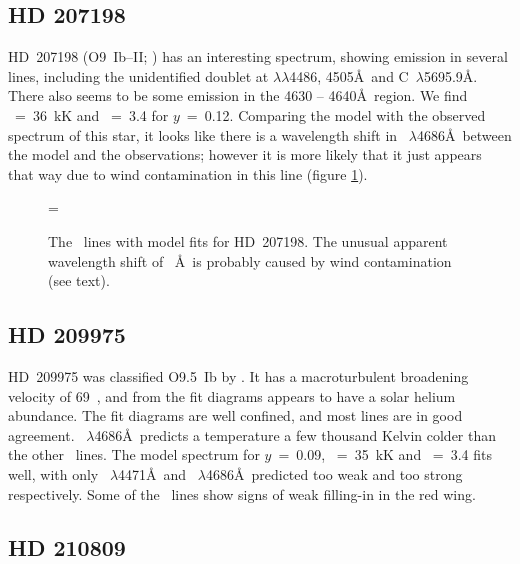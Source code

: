 \subsection{HD 207198}  %
\label{analysis:hd207198}
HD~207198 (O9~Ib--II; \cite{wa:76}) has an interesting spectrum,
showing emission in several lines, including the unidentified doublet
at $\lambda\lambda$4486, 4505\AA\ and
C~$\lambda$5695.9\AA. There also seems to be some emission in
the 4630 -- 4640\AA\ region. We find \teff~=~36~kK and
\logg~=~3.4 for $y$~=~0.12. Comparing the model with the observed
spectrum of this star, it looks like there is a wavelength shift in
\heii~$\lambda$4686\AA\ between the model and the observations;
however it is more likely that it just appears that way due to wind
contamination in this line (figure \ref{fig:hd207198}).

\begin{figure} %
\epsfxsize=\figwidth
\setlength{\cen}{(\textwidth / 2) - (\epsfxsize / 2)}
\hspace{\cen}
\caption[Unusual wavelength shift of \heii~\AA\ in HD~207198]
{\fcfont The \heii\ lines with model fits for HD~207198. The unusual
apparent wavelength shift of \heii~\AA\ is probably caused by
wind contamination (see text).}
\label{fig:hd207198}
\end{figure} %

\subsection{HD 209975}  %
\label{analysis:hd209975}
HD~209975 was classified O9.5~Ib by . It has a
macroturbulent broadening velocity of 69~\kms, and from the fit
diagrams appears to have a solar helium abundance. The fit diagrams are
well confined, and most lines are in good agreement.
\heii~$\lambda$4686\AA\ predicts a temperature a few thousand Kelvin
colder than the other \heii\ lines. The model spectrum for $y$~=~0.09,
\teff~=~35~kK and \logg~=~3.4 fits well, with only
\hei~$\lambda$4471\AA\ and \heii~$\lambda$4686\AA\ predicted too weak
and too strong respectively. Some of the \hi\ lines show signs of weak
filling-in in the red wing.

\subsection{HD 210809}  %
\label{analysis:hd210809}

